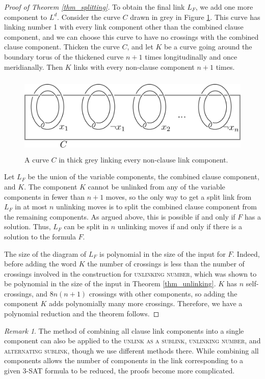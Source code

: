 \documentclass[12pt]{amsart}
\theoremstyle{definition}
\theoremstyle{remark}
\newtheorem{rem}[thm]{Remark}
\begin{document}
\begin{proof}[Proof of Theorem \ref{thm_splitting}]
To obtain the final link $L_F$, we add one more component to $L^d$.  Consider the curve $C$ drawn in grey in Figure \ref{fig_hopfdoublechain}.  This curve has linking number 1 with every link component other than the combined clause component, and we can choose this curve to have no crossings with the combined clause component.  Thicken the curve $C$, and let $K$ be a curve going around the boundary torus of the thickened curve $n+1$ times longitudinally and once meridianally.  Then $K$ links with every non-clause component $n+1$ times.
\begin{figure}[h]
\centering
\includegraphics[height=1.5in]{wdoublechain.png}
\caption{A curve $C$ in thick grey linking every non-clause link component.}
\label{fig_hopfdoublechain}
\end{figure}

Let $L_F$ be the union of the variable components, the combined clause component, and $K$. The component $K$ cannot be unlinked from any of the variable components in fewer than $n+1$ moves, so the only way to get a split link from $L_F$ in at most $n$ unlinking moves is to split the combined clause component from the remaining components.  As argued above, this is possible if and only if $F$ has a solution.  Thus, $L_F$ can be split in $n$ unlinking moves if and only if there is a solution to the formula $F$.

The size of the diagram of $L_F$ is polynomial in the size of the input for $F$.  Indeed, before adding the word $K$ the number of crossings is less than the number of crossings involved in the construction for \textsc{unlinking number}, which was shown to be polynomial in the size of the input in Theorem \ref{thm_unlinking}.  $K$ has $n$ self-crossings, and $8n(n+1)$ crossings with other components, so adding the component $K$ adds polynomially many more crossings. Therefore, we have a polynomial reduction and the theorem follows. \end{proof}

\begin{rem}
The method of combining all clause link components into a single component can also be applied to the \textsc{unlink as a sublink}, \textsc{unlinking number}, and \textsc{alternating sublink}, though we use different methods there. While combining all components allows the number of components in the link corresponding to a given 3-SAT formula to be reduced, the proofs become more complicated.
\end{rem}
\end{document}
